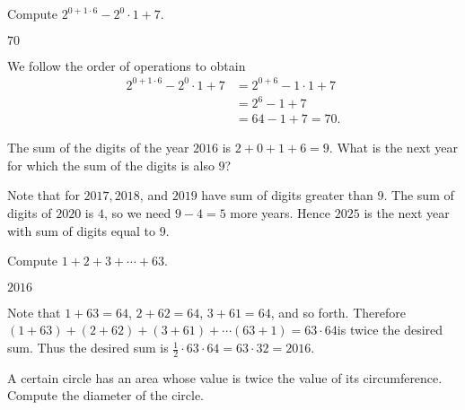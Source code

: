 \documentclass[11pt]{article}
\begin{document}
\begin{problem}
Compute $2^{0 + 1 \cdot 6} - 2^0 \cdot 1 + 7$.
\end{problem}

\begin{answer}
$\boxed{70}$
\end{answer}

\begin{solution}
We follow the order of operations to obtain \begin{align*} 2^{0 + 1 \cdot 6} - 2^0 \cdot 1 + 7 &= 2^{0 + 6} - 1 \cdot 1 + 7 \\ &= 2^6 - 1 + 7 \\ &= 64 - 1 + 7 = \boxed{70}. \end{align*}
\end{solution}


\begin{problem}
The sum of the digits of the year $2016$ is $2 + 0 + 1 + 6 = 9$. What is the next year for which the sum of the digits is also $9$?
\end{problem}

\begin{answer}
\end{answer}

\begin{solution}
Note that for $2017, 2018$, and $2019$ have sum of digits greater than $9$. The sum of digits of $2020$ is $4$, so we need $9-4 = 5$ more years. Hence $\boxed{2025}$ is the next year with sum of digits equal to $9$.
\end{solution}


\begin{problem}
Compute $1 + 2 + 3 + \cdots +  63$.
\end{problem}

\begin{answer}
$\boxed{2016}$
\end{answer}

\begin{solution}
Note that $1 + 63 = 64$, $2 + 62 = 64$, $3 + 61 = 64$, and so forth. Therefore $(1 + 63) + (2 + 62) + (3 + 61) + \cdots (63 + 1) = 63 \cdot 64$is twice the desired sum. Thus the desired sum is $\frac{1}{2} \cdot 63 \cdot 64 = 63 \cdot 32 = \boxed{2016}$.
\end{solution}


\begin{problem}%
A certain circle has an area whose value is twice the value of its circumference. Compute the diameter of the circle.
\end{problem}
\end{document}
